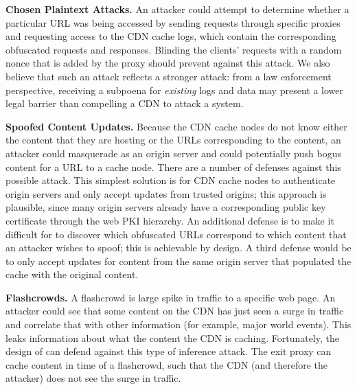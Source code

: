 {\bf Chosen Plaintext Attacks.} An attacker could attempt to
determine whether a particular URL was being accessed by sending requests
through specific \system{} proxies and requesting access to the CDN cache logs, 
which contain the corresponding obfuscated
requests and responses. Blinding the clients' requests
with a random nonce that is added by the proxy should prevent against this
attack. We also believe that such an attack reflects a stronger attack: from a
law enforcement perspective, receiving a subpoena for {\em existing} logs and
data may present a lower legal barrier than compelling a CDN to attack a
system.

{\bf Spoofed Content Updates.} Because the CDN cache
nodes do not know either the content that they are hosting or the URLs
corresponding to the content, an attacker could masquerade as an origin server
and could potentially push bogus content for a URL to a cache node. There are
a number of defenses against this possible attack. This simplest solution is
for CDN cache nodes to authenticate origin servers and only accept updates
from trusted origins; this approach is plausible, since many origin servers already
have a corresponding public key certificate through the web PKI hierarchy.  An additional
defense is to make it difficult for to discover which obfuscated URLs correspond
to which content that an attacker wishes to spoof; this is achievable by design.
A third defense would be to only accept updates for content from the same origin
server that populated the cache with the original content.

{\bf Flashcrowds.}  A flashcrowd is large spike in traffic to a specific web page.  An attacker 
could see that some content on the CDN has just seen a surge in traffic and correlate that with 
other information (for example, major world events).  This leaks information about what the content the 
CDN is caching.  Fortunately, the design of \system{} can defend against this type of inference attack.  
The exit proxy can cache content in time of a flashcrowd, such that the CDN (and therefore the attacker) 
does not see the surge in traffic.  
